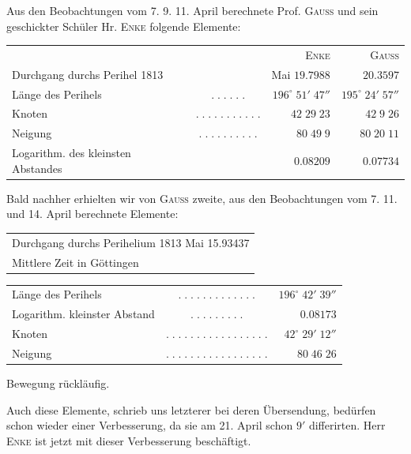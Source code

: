 \par\indent Aus den Beobachtungen vom 7. 9. 11. April berechnete Prof. \textsc{Gauss} und sein geschickter Schüler Hr. \textsc{Enke} folgende Elemente:

\begin{center}\fontsize{9}{11}\selectfont\setlength{\tabcolsep}{5pt}\renewcommand{\arraystretch}{1.15}\begin{tabular}{lcrr}
& & \textsc{Enke} & \textsc{Gauss}\\
Durchgang durchs Perihel 1813 & & Mai $19.7988$ & $20.3597$\\
Länge des Perihels & $.\;.\;.\;.\;.\;.$ & $196^\circ\;51'\;47''$ & $195^\circ\;24'\;57''$\\
Knoten & $.\;.\;.\;.\;.\;.\;.\;.\;.\;.\;.$ & $42\;29\;23$ & $42\;9\;26$\\
Neigung & $.\;.\;.\;.\;.\;.\;.\;.\;.\;.$ & $80\;49\;9$ & $80\;20\;11$\\
Logarithm. des kleinsten Abstandes &  & $0.08209$ & $0.07734$\\
\end{tabular}\end{center}

\par\indent Bald nachher erhielten wir von \textsc{Gauss} zweite, aus den Beobachtungen vom 7. 11. und 14. April berechnete Elemente:

\begin{center}\fontsize{10}{12}\selectfont\setlength{\tabcolsep}{2pt}\renewcommand{\arraystretch}{1.15}\begin{tabular}{l}
Durchgang durchs Perihelium 1813 Mai 15.93437\\Mittlere Zeit in Göttingen\\
\end{tabular}\end{center}\begin{center}\fontsize{10}{12}\selectfont\setlength{\tabcolsep}{2pt}\renewcommand{\arraystretch}{1.15}\begin{tabular}{lcr}
Länge des Perihels & $.\;.\;.\;.\;.\;.\;.\;.\;.\;.\;.\;.\;.$ & $196^\circ\;42'\;39''$\\
Logarithm. kleinster Abstand & $.\;.\;.\;.\;.\;.\;.\;.\;.$ & $0.08173$\\
Knoten & $.\;.\;.\;.\;.\;.\;.\;.\;.\;.\;.\;.\;.\;.\;.\;.\;.$ & $42^\circ\;29'\;12''$\\
Neigung & $.\;.\;.\;.\;.\;.\;.\;.\;.\;.\;.\;.\;.\;.\;.\;.\;.$ & $80\;46\;26$\\
\end{tabular}\end{center}

\noindent Bewegung rückläufig.

\par\indent Auch diese Elemente, schrieb uns letzterer bei deren Übersendung, bedürfen schon wieder einer Verbesserung, da sie am 21. April schon $9'$ differirten. Herr \textsc{Enke} ist jetzt mit dieser Verbesserung beschäftigt.
